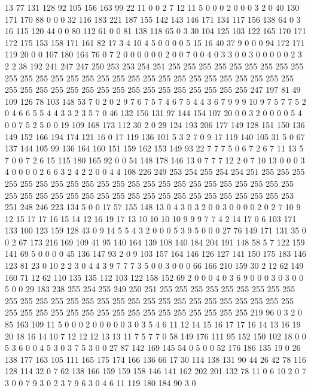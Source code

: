13 77 131 128 92 105 156 163 99 22 11 0 0 2 7 12 11 5 0 0
0 2 0 0 0 3 2 0 40 130 171 170 88 0 0 0 32 116 183 221
187 155 142 143 146 171 134 117 156 138 64 0 3 16 115 120 44 0 0 80
112 61 0 0 81 138 118 65 0 3 30 104 125 103 122 165 170 171 172 175
153 158 171 161 82 17 3 4 10 4 5 0 0 0 0 5 15 16 40 37
9 0 0 0 94 172 171 119 20 0 0 107 180 164 76 0 7 2 0 0
0 0 0 0 2 0 0 7 0 0 4 0 3 3 0 0 3 0 0 0
0 0 2 3 2 2 38 192 241 247 247 250 253 253 254 251 255 255 255 255
255 255 255 255 255 255 255 255 255 255 255 255 255 255 255 255 255 255 255 255
255 255 255 255 255 255 255 255 255 255 255 255 255 255 255 255 255 255 255 255
247 197 81 49 109 126 78 103 148 53 7 0 2 0 2 9 7 6 7 5
7 4 6 7 5 4 4 3 6 7 9 9 9 10 9 7 5 7 7 5
2 0 4 6 6 5 5 4 4 3 3 2 3 5 7 0 46 132 156 131
97 144 154 107 20 0 0 3 2 0 0 0 0 5 4 0 0 7 5 2
5 0 0 19 109 168 173 112 30 2 0 29 124 193 206 177 149 128 151 150
136 149 152 166 194 174 121 16 0 17 119 136 101 5 3 2 7 0 9 17
119 140 105 31 5 0 67 137 144 105 99 136 164 160 151 159 162 153 149 93
22 7 7 7 5 0 6 7 2 6 7 11 13 5 7 0 0 7 2 6
15 115 180 165 92 0 0 54 148 178 146 13 0 7 7 7 12 2 0 7
10 13 0 0 0 3 4 0 0 0 0 2 6 6 3 2 4 2 2 0
0 4 4 108 226 249 253 254 255 254 254 251 255 255 255 255 255 255 255 255
255 255 255 255 255 255 255 255 255 255 255 255 255 255 255 255 255 255 255 255
255 255 255 255 255 255 255 255 255 255 255 255 253 251 248 246 223 134 5 0
0 17 57 155 148 13 0 4 3 0 3 2 0 0 3 0 0 0 0 2
0 2 7 10 9 12 15 17 17 16 15 14 12 16 19 17 13 10 10 10
10 9 9 9 7 7 4 2 14 17 0 6 103 171 133 100 123 159 128 43
0 9 14 5 5 4 3 2 0 0 0 5 3 9 5 0 0 0 27 76
149 171 131 35 0 0 2 67 173 216 169 109 41 95 140 164 139 108 140 184
204 191 148 58 5 7 122 159 141 69 5 0 0 0 0 45 136 147 93 2
0 9 103 157 164 146 126 127 141 150 175 183 146 123 81 23 0 10 2 2
3 0 4 4 3 9 7 7 7 3 5 0 0 3 0 0 0 66 166 210
159 30 2 12 62 149 160 71 12 62 110 135 135 112 103 122 158 152 69 2
0 0 0 4 0 3 6 9 0 0 0 3 0 3 0 0 5 0 0 29
183 238 255 254 255 249 250 251 255 255 255 255 255 255 255 255 255 255 255 255
255 255 255 255 255 255 255 255 255 255 255 255 255 255 255 255 255 255 255 255
255 255 255 255 255 255 255 255 255 255 255 255 219 96 0 3 2 0 85 163
109 11 5 0 0 0 2 0 0 0 0 0 3 0 3 5 4 6 11 12
14 15 16 17 17 16 14 13 16 19 20 18 16 14 10 7 12 12 12 13
13 11 7 5 7 7 0 58 149 176 111 95 152 150 102 18 0 0 5 3
6 0 0 4 5 3 0 3 7 5 3 0 0 27 87 142 169 145 54 0
5 0 0 52 176 186 135 19 0 26 138 177 163 105 111 165 175 174 166 136
66 17 30 114 138 131 90 44 26 42 78 116 128 114 32 0 7 62 138 166
159 159 158 146 141 162 202 201 132 78 11 0 6 10 2 0 7 3 0 0
7 9 3 0 2 3 7 9 6 3 0 4 6 11 119 180 184 90 3 0
